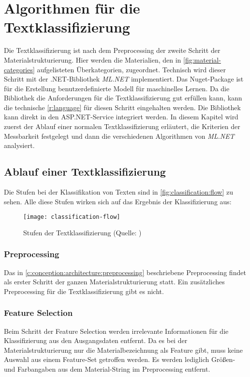 \section{Algorithmen für die Textklassifizierung}
\label{c:conception:classification}
Die Textklassifizierung ist nach dem Preprocessing der zweite Schritt der Materialstrukturierung. Hier werden die Materialien, den in \autoref{fig:material-categories} aufgelisteten Überkategorien, zugeordnet.
Technisch wird dieser Schritt mit der .NET-Bibliothek \textit{ML.NET} implementiert. Das Nuget-Package ist für die Erstellung benutzerdefinierte Modell für maschinelles Lernen. \citep[vgl.][]{mlnet_doc2022} Da die Bibliothek die Anforderungen für die Textklassifizierung gut erfüllen kann, kann die technische \autoref{r:language} für diesen Schritt eingehalten werden. Die Bibliothek kann direkt in den ASP.NET-Service integriert werden.
In diesem Kapitel wird zuerst der Ablauf einer normalen Textklassifizierung erläutert, die Kriterien der Messbarkeit festgelegt und dann die verschiedenen Algorithmen von \textit{ML.NET} analysiert.

\subsection{Ablauf einer Textklassifizierung}
\label{c:conception:classification:steps}
Die Stufen bei der Klassifikation von Texten sind in \autoref{fig:classification:flow} zu sehen. Alle diese Stufen wirken sich auf das Ergebnis der Klassifizierung aus:

\begin{figure}[h]
	\centering
	\texttt{[image: classification-flow]}
	\caption[Textklassifizierung]{Stufen der Textklassifizierung (Quelle:  \cite{Foram_2016})}
	\label{fig:classification:flow}
\end{figure}

\subsubsection{Preprocessing}
Das in \autoref{c:conception:architecture:preprocessing} beschriebene Preprocessing findet als erster Schritt der ganzen Materialstrukturierung statt. Ein zusätzliches Preprocessing für die Textklassifizierung gibt es nicht.

\subsubsection{Feature Selection}
Beim Schritt der Feature Selection werden irrelevante Informationen für die Klassifizierung aus den Ausgangsdaten entfernt. Da es bei der Materialstrukturierung nur die Materialbezeichnung als Feature gibt, muss keine Auswahl aus einem Feature-Set getroffen werden. Es werden lediglich Größen- und Farbangaben aus dem Material-String im Preprocessing entfernt.

